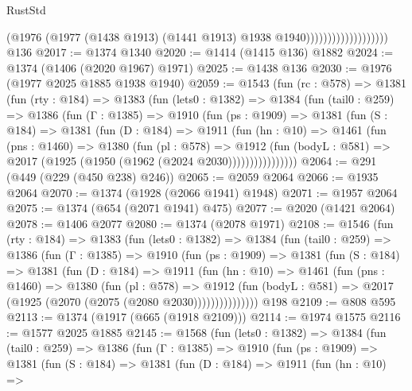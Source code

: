 \begin{lexlean}{RustStd}
\begin{coremodule}
                                      (@1976
                                        (@1977
                                          (@1438 @1913)
                                          (@1441 @1913)
                                          @1938
                                          @1940)))))))))))))))))))
    @136
@2017 := @1374 @1340
@2020 := @1414 (@1415 @136) @1882
@2024 := @1374 (@1406 (@2020 @1967) @1971)
@2025 := @1438 @136
@2030 := @1976 (@1977 @2025 @1885 @1938 @1940)
@2059 := @1543
    (fun (rc : @578) =>
    @1381
      (fun (rty : @184) =>
      @1383
        (fun (lets0 : @1382) =>
        @1384
          (fun (tail0 : @259) =>
          @1386
            (fun (Γ : @1385) =>
            @1910
              (fun (ps : @1909) =>
              @1381
                (fun (S : @184) =>
                @1381
                  (fun (D : @184) =>
                  @1911
                    (fun (hn : @10) =>
                    @1461
                      (fun (pns : @1460) =>
                      @1380
                        (fun (pl : @578) =>
                        @1912
                          (fun (bodyL : @581) =>
                          @2017 (@1925 (@1950 (@1962 (@2024 @2030))))))))))))))))
@2064 := @291 (@449 (@229 (@450 @238) @246))
@2065 := @2059 @2064
@2066 := @1935 @2064
@2070 := @1374 (@1928 (@2066 @1941) @1948)
@2071 := @1957 @2064
@2075 := @1374 (@654 (@2071 @1941) @475)
@2077 := @2020 (@1421 @2064)
@2078 := @1406 @2077
@2080 := @1374 (@2078 @1971)
@2108 := @1546
    (fun (rty : @184) =>
    @1383
      (fun (lets0 : @1382) =>
      @1384
        (fun (tail0 : @259) =>
        @1386
          (fun (Γ : @1385) =>
          @1910
            (fun (ps : @1909) =>
            @1381
              (fun (S : @184) =>
              @1381
                (fun (D : @184) =>
                @1911
                  (fun (hn : @10) =>
                  @1461
                    (fun (pns : @1460) =>
                    @1380
                      (fun (pl : @578) =>
                      @1912
                        (fun (bodyL : @581) =>
                        @2017 (@1925 (@2070 (@2075 (@2080 @2030)))))))))))))))
    @198
@2109 := @808 @595
@2113 := @1374 (@1917 (@665 (@1918 @2109)))
@2114 := @1974 @1575
@2116 := @1577 @2025 @1885
@2145 := @1568
    (fun (lets0 : @1382) =>
    @1384
      (fun (tail0 : @259) =>
      @1386
        (fun (Γ : @1385) =>
        @1910
          (fun (ps : @1909) =>
          @1381
            (fun (S : @184) =>
            @1381
              (fun (D : @184) =>
              @1911
                (fun (hn : @10) =>

\end{coremodule}
\end{lexlean}
